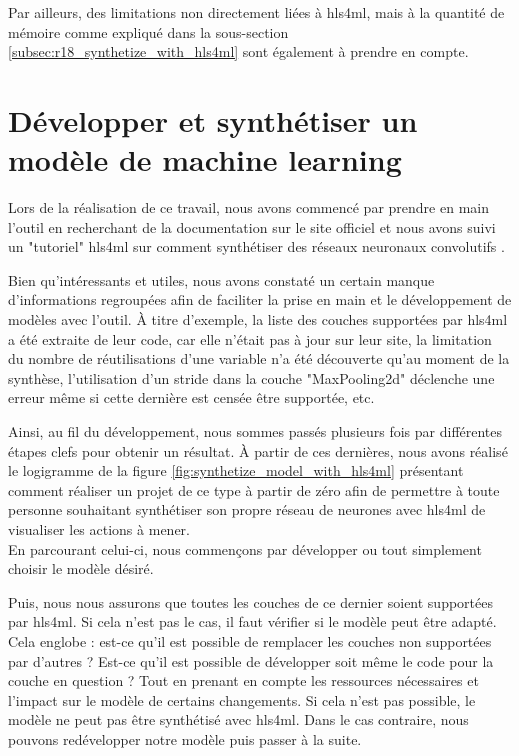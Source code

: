 Par ailleurs, des limitations non directement liées à \acrshort{hls4ml}, mais à la quantité de mémoire comme expliqué dans la sous-section \ref{subsec:r18_synthetize_with_hls4ml} sont également à prendre en compte.

\section{Développer et synthétiser un modèle de machine learning}

Lors de la réalisation de ce travail, nous avons commencé par prendre en main l'outil en recherchant de la documentation sur le site officiel \cite{noauthor_extension_nodate} et nous avons suivi un "tutoriel" \acrshort{hls4ml} sur comment synthétiser des réseaux neuronaux convolutifs \cite{noauthor_hls4ml-tutorialpart6_cnnsipynb_nodate}.

Bien qu'intéressants et utiles, nous avons constaté un certain manque d'informations regroupées afin de faciliter la prise en main et le développement de modèles avec l'outil. À titre d'exemple, la liste des couches supportées par \acrshort{hls4ml} a été extraite de leur code, car elle n'était pas à jour sur leur site, la limitation du nombre de réutilisations d'une variable n'a été découverte qu'au moment de la synthèse, l'utilisation d'un stride dans la couche "MaxPooling2d" déclenche une erreur même si cette dernière est censée être supportée, etc.

Ainsi, au fil du développement, nous sommes passés plusieurs fois par différentes étapes clefs pour obtenir un résultat. À partir de ces dernières, nous avons réalisé le logigramme de la figure \ref{fig:synthetize_model_with_hls4ml} présentant comment réaliser un projet de ce type à partir de zéro afin de permettre à toute personne souhaitant synthétiser son propre réseau de neurones avec \acrshort{hls4ml} de visualiser les actions à mener.\\

En parcourant celui-ci, nous commençons par développer ou tout simplement choisir le modèle désiré.

Puis, nous nous assurons que toutes les couches de ce dernier soient supportées par \acrshort{hls4ml}. Si cela n'est pas le cas, il faut vérifier si le modèle peut être adapté. Cela englobe : est-ce qu'il est possible de remplacer les couches non supportées par d'autres ? Est-ce qu'il est possible de développer soit même le code pour la couche en question ? Tout en prenant en compte les ressources nécessaires et l'impact sur le modèle de certains changements. Si cela n'est pas possible, le modèle ne peut pas être synthétisé avec \acrshort{hls4ml}. Dans le cas contraire, nous pouvons redévelopper notre modèle puis passer à la suite.


